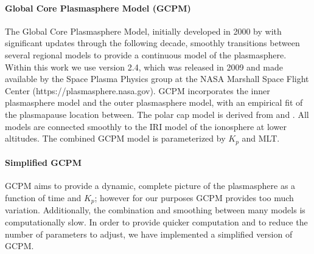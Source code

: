 \paragraph{Global Core Plasmasphere Model (GCPM)}
\label{section:gcpm}
The Global Core Plasmasphere Model, initially developed in 2000 by \cite{Gallagher1999} with significant updates through the following decade, smoothly transitions between several regional models to provide a continuous model of the plasmasphere. Within this work we use version 2.4, which was released in 2009 and made available by the Space Plasma Physics group at the NASA Marshall Space Flight Center (https://plasmasphere.nasa.gov). GCPM incorporates the \cite{Carpenter1992} inner plasmasphere model and the \cite{Gallagher1995} outer plasmasphere model, with an empirical fit of the plasmapause location between. The polar cap model is derived from \cite{Persoon1983} and \cite{Chandler1991}. All models are connected smoothly to the IRI model of the ionosphere at lower altitudes. The combined GCPM model is parameterized by $K_p$ and MLT.

\paragraph{Simplified GCPM}

GCPM aims to provide a dynamic, complete picture of the plasmasphere as a function of time and $K_p$; however for our purposes GCPM provides too much variation. Additionally, the combination and smoothing between many models is computationally slow. In order to provide quicker computation and to reduce the number of parameters to adjust, we have implemented a simplified version of GCPM.

